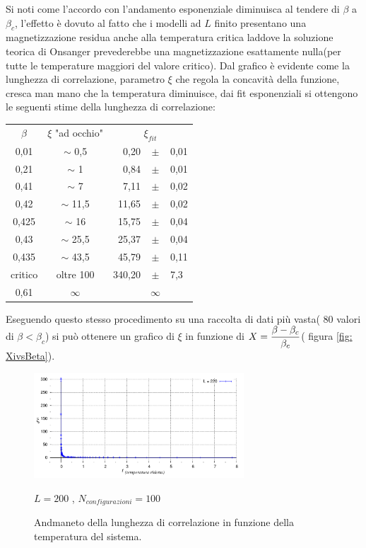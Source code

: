 Si noti come l'accordo con l'andamento esponenziale diminuisca al tendere di $\beta$ a $\beta_c$, l'effetto è dovuto al fatto che i modelli ad $L$ finito presentano una magnetizzazione residua anche alla temperatura critica laddove la soluzione teorica di Onsanger prevederebbe una magnetizzazione esattamente nulla(per tutte le temperature maggiori del valore critico).
\newline
Dal grafico è evidente come la lunghezza di correlazione, parametro $\xi$ che regola la concavità della funzione, cresca man mano che la temperatura diminuisce, dai fit esponenziali si ottengono le seguenti stime della lunghezza di correlazione:

\begin{center}
\begin{tabular}{|c|c |r c l| }
\hline
$\beta$	& $\xi$ \footnotesize{"ad occhio"}	&\multicolumn{3}{|c|}{$\xi_{fit}$	} \\
0,01	& $\sim$ 0,5	&0,20	&$\pm$	&0,01\\
0,21	& $\sim$ 1	&0,84	&$\pm$	&0,01\\
0,41	& $\sim$ 7	&7,11	&$\pm$	&0,02\\
0,42	& $\sim$ 11,5	&11,65	&$\pm$	&0,02\\
0,425	& $\sim$ 16	&15,75	&$\pm$	&0,04\\
0,43	& $\sim$ 25,5	&25,37	&$\pm$	&0,04\\
0,435	& $\sim$ 43,5	&45,79	&$\pm$	&0,11\\
critico	& oltre 100	&340,20	&$\pm$	&7,3\\
\hline
0,61	& $\infty$ 	& 	& $\infty$	& \\
\hline
\end{tabular}
\end{center}

Eseguendo questo stesso procedimento su una raccolta di dati più vasta( 80 valori di $\beta < \beta_c$) si può ottenere un grafico di $\xi$ in funzione di $X=\small \dfrac{\beta -\beta_c}{\beta_c}$( figura \ref{fig: XivsBeta}).

\begin{figure}[h!]
       \caption[ParteC$\_$StS0vst$\_$Moltitudini $\;\rightarrow\;$ molti\_S0Stvst.p ]{Andmaneto della lunghezza di correlazione in funzione della temperatura del sistema.}\label{fig: Xivst}
     \centering
		\includegraphics[width=0.70\textwidth]{Immagini/ParteC/xivst}

\footnotesize  $L= 200$ , $N_{configurazioni} = 100$
\end{figure}

